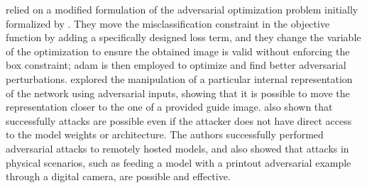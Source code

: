 \citet{carlini2016towards} relied on a modified formulation of the adversarial optimization problem initially formalized by \citet{szegedy2013intriguing}.
They move the misclassification constraint in the objective function by adding a specifically designed loss term, and they change the variable of the optimization to ensure the obtained image is valid without enforcing the box constraint;
\gls{adam} is then employed to optimize and find better adversarial perturbations.
\citet{sabour2015adversarial} explored the manipulation of a particular internal representation of the network using adversarial inputs, showing that it is possible to move the representation closer to the one of a provided guide image.
\citet{papernot2016practical} also shown that successfully attacks are possible even if the attacker does not have direct access to the model weights or architecture.
The authors successfully performed adversarial attacks to remotely hosted models, and \citet{kurakin2016adversarial} also showed that attacks in physical scenarios, such as feeding a model with a printout adversarial example through a digital camera, are possible and effective.

